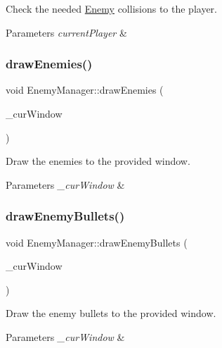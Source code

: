 Check the needed \hyperlink{class_enemy}{Enemy} collisions to the player. 


\begin{DoxyParams}{Parameters}
{\em current\+Player} & \\
\hline
\end{DoxyParams}
\mbox{\label{class_enemy_manager_af740dd63780a06fde9a5dd72330624da}} 
\subsubsection{\texorpdfstring{draw\+Enemies()}{drawEnemies()}}
{\footnotesize\ttfamily void Enemy\+Manager\+::draw\+Enemies (\begin{DoxyParamCaption}\item[{sf\+::\+Render\+Window $\ast$}]{\+\_\+cur\+Window }\end{DoxyParamCaption})}



Draw the enemies to the provided window. 


\begin{DoxyParams}{Parameters}
{\em \+\_\+cur\+Window} & \\
\hline
\end{DoxyParams}
\mbox{\label{class_enemy_manager_ae551aa23d45b17e6c9b3d5b12e39ab26}} 
\subsubsection{\texorpdfstring{draw\+Enemy\+Bullets()}{drawEnemyBullets()}}
{\footnotesize\ttfamily void Enemy\+Manager\+::draw\+Enemy\+Bullets (\begin{DoxyParamCaption}\item[{sf\+::\+Render\+Window $\ast$}]{\+\_\+cur\+Window }\end{DoxyParamCaption})}



Draw the enemy bullets to the provided window. 


\begin{DoxyParams}{Parameters}
{\em \+\_\+cur\+Window} & \\
\hline
\end{DoxyParams}
\mbox{\label{class_enemy_manager_abafa080764d42fbc020c33e48c7afb2f}} 
